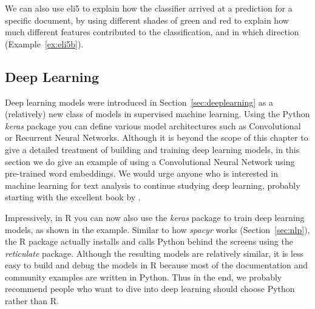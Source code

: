 
We can also use eli5 to explain how the classifier arrived at a
prediction for a specific document, by using different shades of green
and red to explain how much different features contributed to the
classification, and in which direction (Example~\ref{ex:eli5b}).


\subsection{Deep Learning}

Deep learning models were introduced in Section~\ref{sec:deeplearning} as a (relatively) new class of models in
supervised machine learning.
Using the Python \emph{keras} package you can define various model architectures such as Convolutional or Recurrent Neural Networks.
Although it is beyond the scope of this chapter to give a detailed treatment of building and training deep learning models, in this section we do give an example of using  a Convolutional Neural Network using pre-trained word embeddings.
We would urge anyone who is interested in machine learning for text analysis to continue studying deep learning, probably starting with the excellent book by \citet{goldberg2017}.

Impressively, in R you can now also use the \emph{keras} package to train deep learning models, as shown in the example.
Similar to how \emph{spacyr} works (Section~\ref{sec:nlp}), the R package actually installs and calls Python behind the screens using the \emph{reticulate} package.
Although the resulting models are relatively similar, it is less easy to build and debug the models in R
 because most of the documentation and community examples are written in Python.
Thus in the end, we probably recommend people who want to dive into deep learning should choose Python rather than R.






